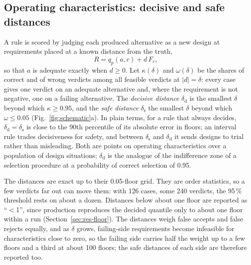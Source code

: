 \documentclass[pdflatex,sn-basic,lineno]{sn-jnl}
\begin{document}
\subsection{Operating characteristics: decisive and safe distances}\label{sec:distances}

A rule is scored by judging each produced alternative as a new design at requirements placed at a known distance from the truth,
\begin{equation}
R = q_p(a,c) + d\,F_c ,
\label{eq:requirement}
\end{equation}
so that $a$ is adequate exactly when $d\ge 0$. Let $\kappa(\delta)$ and $\omega(\delta)$ be the shares of correct and of wrong verdicts among all feasible verdicts at $|d|=\delta$: every case gives one verdict on an adequate alternative and, where the requirement is not negative, one on a failing alternative. The \emph{decisive distance} $\delta_\mathrm{d}$ is the smallest $\delta$ beyond which $\kappa\ge 0.95$, and the \emph{safe distance} $\delta_\mathrm{s}$ the smallest $\delta$ beyond which $\omega\le 0.05$ (Fig.~\ref{fig:schematic}a). In plain terms, for a rule that always decides, $\delta_\mathrm{d}=\delta_\mathrm{s}$ is close to the 90th percentile of its absolute error in floors; an interval rule trades decisiveness for safety, and between $\delta_\mathrm{s}$ and $\delta_\mathrm{d}$ it sends designs to trial rather than misleading. Both are points on operating characteristics over a population of design situations; $\delta_\mathrm{d}$ is the analogue of the indifference zone of a selection procedure \citep{bechhofer1954single} at a probability of correct selection of 0.95.

The distances are exact up to their 0.05-floor grid. They are order statistics, so a few verdicts far out can move them: with 126 cases, some 240 verdicts, the 95\,\% threshold rests on about a dozen. Distances below about one floor are reported as ``$<$1'', since production reproduces the decided quantile only to about one floor within a run (Section~\ref{sec:res-floor}). The distances weigh false accepts and false rejects equally, and as $\delta$ grows, failing-side requirements become infeasible for characteristics close to zero, so the failing side carries half the weight up to a few floors and a third at about 100 floors; the safe distances of each side are therefore reported too.
\end{document}

